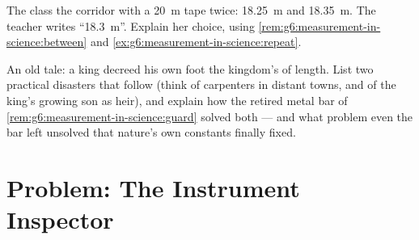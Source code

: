 \begin{exercise}[$\star\star$]\label{exo:g6:measurement-in-science:11}
The class  the corridor with a \qty{20}{m} tape twice:
\qty{18.25}{m} and \qty{18.35}{m}. The teacher writes
``\qty{18.3}{m}''. Explain her choice, using
\cref{rem:g6:measurement-in-science:between} and
\cref{ex:g6:measurement-in-science:repeat}.
\end{exercise}

\begin{exercise}[$\star\star\star$]\label{exo:g6:measurement-in-science:12}
An old tale: a king decreed his own foot the kingdom's  of
length. List two practical disasters that follow (think of
carpenters in distant towns, and of the king's growing son as
heir), and explain how the retired metal bar of
\cref{rem:g6:measurement-in-science:guard} solved both --- and
what problem even the bar left unsolved that nature's own
constants finally fixed.
\end{exercise}

\section{Problem: The Instrument Inspector}

